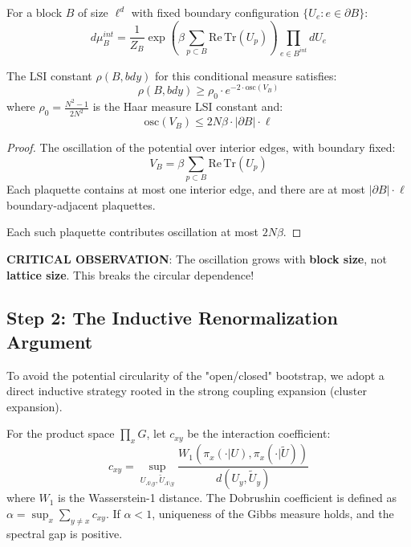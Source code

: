 \begin{theorem}
\begin{lemma}
\label{lem:interior-block}
For a block $B$ of size $\ell^d$ with fixed boundary configuration $\{U_e : e \in \partial B\}$:
\begin{equation}
d\mu_{B}^{int} = \frac{1}{Z_B} \exp\left(\beta \sum_{p \subset B} \mathrm{Re}\,\mathrm{Tr}(U_p)\right) 
\prod_{e \in B^{int}} dU_e
\end{equation}

The LSI constant $\rho(B, bdy)$ for this conditional measure satisfies:
\begin{equation}
\rho(B, bdy) \geq \rho_0 \cdot e^{-2 \cdot \mathrm{osc}(V_B)}
\end{equation}
where $\rho_0 = \frac{N^2-1}{2N^2}$ is the Haar measure LSI constant and:
\begin{equation}
\mathrm{osc}(V_B) \leq 2N\beta \cdot |\partial B| \cdot \ell
\end{equation}
\end{lemma}

\begin{proof}
The oscillation of the potential over interior edges, with boundary fixed:
\begin{equation}
V_B = \beta \sum_{p \subset B} \mathrm{Re}\,\mathrm{Tr}(U_p)
\end{equation}
Each plaquette contains at most one interior edge, and there are at most 
$|\partial B| \cdot \ell$ boundary-adjacent plaquettes.

Each such plaquette contributes oscillation at most $2N\beta$.
\end{proof}

\textbf{CRITICAL OBSERVATION}: The oscillation grows with \textbf{block size}, 
not \textbf{lattice size}. This breaks the circular dependence!

\subsection{Step 2: The Inductive Renormalization Argument}

To avoid the potential circularity of the "open/closed" bootstrap, we adopt a direct inductive strategy rooted in the strong coupling expansion (cluster expansion).

\begin{definition}
For the product space $\prod_x G$, let $c_{xy}$ be the interaction coefficient:
\begin{equation}
c_{xy} = \sup_{U_{\Lambda \setminus y}, \tilde{U}_{\Lambda \setminus y}} \frac{W_1(\pi_x(\cdot | U), \pi_x(\cdot | \tilde{U}))}{d(U_y, \tilde{U}_y)}
\end{equation}
where $W_1$ is the Wasserstein-1 distance. The Dobrushin coefficient is defined as $\alpha = \sup_x \sum_{y \ne x} c_{xy}$.
If $\alpha < 1$, uniqueness of the Gibbs measure holds, and the spectral gap is positive.
\end{definition}


\end{theorem}
